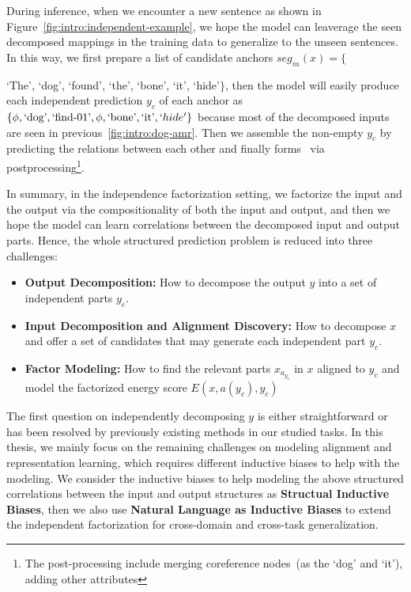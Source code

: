 During inference, when we encounter a new sentence as shown in
Figure~\ref{fig:intro:independent-example}, we hope the model can
leaverage the seen decomposed mappings in the training data to
generalize to the unseen sentences. In this way, we first prepare a
list of candidate anchors $seg_{in}(x)=\{${`The', `dog', `found',
  `the', `bone', `it', `hide'$\}$, then the model will easily produce
  each independent prediction $y_{c}$ of each anchor as
  $\{\phi,\text{`dog'}, \text{`find-01'}, \phi, \text{`bone'},\text{`it'},
  `hide'\}$ because most of the decomposed inputs are seen in
  previous~\autoref{fig:intro:dog-amr}. Then we assemble the non-empty
  $y_{c}$ by predicting the relations between each other and finally
  forms \OUT~via postprocessing\footnote{The post-processing include
    merging coreference nodes~(as the `dog' and `it'), adding other
    attributes}.

   In summary, in
  the independence factorization setting, we factorize the input and
  the output via the compositionality of both the input and output,
  and then we hope the model can learn correlations between the
  decomposed input and output parts. Hence, the whole structured
  prediction problem is reduced into three challenges:

\begin{itemize}
\item \textbf{Output Decomposition:} How to decompose the output $y$
  into a set of independent parts $y_{c}$.

\item \textbf{Input Decomposition and Alignment Discovery:} How to decompose $x$ and offer a
  set of candidates that may generate each independent part $y_{c}$.
\item \textbf{Factor Modeling:} How to find the relevant parts
  $x_{a_{y_{c}}}$ in $x$ aligned to ${y_{c}}$ and model the factorized
  energy score $E(x, a(y_{c}), y_{c})$
\end{itemize}

The first question on independently decomposing $y$ is either
straightforward or has been resolved by previously existing methods in
our studied tasks. In this thesis, we mainly focus on the remaining
challenges on modeling alignment and representation learning, which
requires different inductive biases to help with the
modeling. We consider the inductive biases to
help modeling the above structured correlations between the input and
output structures as \textbf{Structual Inductive Biases}, then we also
use \textbf{Natural Language as Inductive Biases} to extend the
independent factorization for cross-domain and cross-task
generalization.

}
